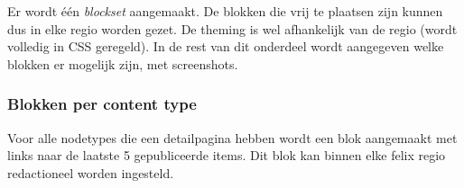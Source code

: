 Er wordt \'{e}\'{e}n \emph{blockset} aangemaakt. De blokken die vrij te plaatsen zijn kunnen dus in elke regio worden gezet. De theming is wel afhankelijk van de regio (wordt volledig in CSS geregeld). In de rest van dit onderdeel wordt aangegeven welke blokken er mogelijk zijn, met screenshots.

\subsubsection{Blokken per content type}\label{felixcontenttypeblokken}

Voor alle nodetypes die een detailpagina hebben wordt een blok aangemaakt met links naar de laatste 5 gepubliceerde items. Dit blok kan binnen elke felix regio redactioneel worden ingesteld.

